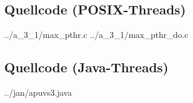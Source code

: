 \documentclass[a4paper,
12pt,
BCOR12mm,
]{scrartcl}
\begin{document}
\subsection*{Quellcode (POSIX-Threads)}
 {../a_3_1/max_pthr.c}
 {../a_3_1/max_pthr_do.c}
\subsection*{Quellcode (Java-Threads)}
 {../jan/apuvs3.java}
\end{document}
